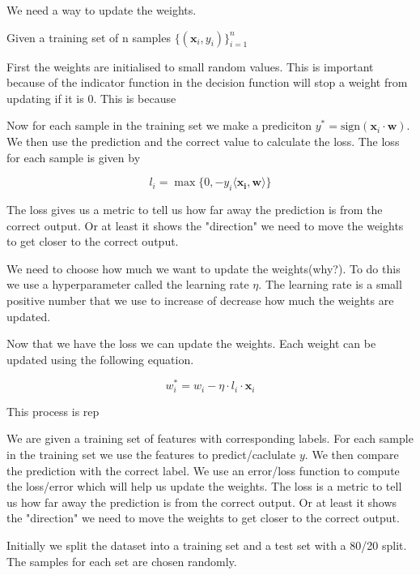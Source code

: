 We need a way to update the weights.

Given a training set of n samples $\{(\boldsymbol{x}_i, y_i)\}^{n}_{i=1}$


First the weights are initialised to small random values. This is important because of the indicator function in the decision function will stop a weight from updating if it is 0. This is because 

Now for each sample in the training set we make a prediciton $y^* = \text{sign}(\boldsymbol{x}_i \cdot \boldsymbol{w})$. We then use the prediction and the correct value to calculate the loss. The loss for each sample is given by 


\begin{equation}
  l_i = \max\{0, -y_i \langle \boldsymbol{x_i}, \boldsymbol{w} \rangle\}
  \label{eq:loss}
\end{equation}

The loss gives us a metric to tell us how far away the prediction is from the correct output. Or at least it shows the "direction" we need to move the weights to get closer to the correct output.

We need to choose how much we want to update the weights(why?). To do this we use a hyperparameter called the learning rate $\eta$. The learning rate is a small positive number that we use to increase of decrease how much the weights are updated. \cite{Marsland2015}

Now that we have the loss we can update the weights. Each weight can be updated using the following equation.

\begin{equation}
  w_{i}^* = w_i - \eta \cdot l_i \cdot \boldsymbol{x}_i
  \label{eq:weight_update}
\end{equation}

This process is rep

We are given a training set of features with corresponding labels. For each sample in the training set we use the features to predict/caclulate $y$. We then compare the prediction with the correct label. We use an error/loss function to compute the loss/error which will help us update the weights. The loss is a metric to tell us how far away the prediction is from the correct output. Or at least it shows the "direction" we need to move the weights to get closer to the correct output.  


Initially we split the dataset into a training set and a test set with a 80/20 split. The samples for each set are chosen randomly. 

